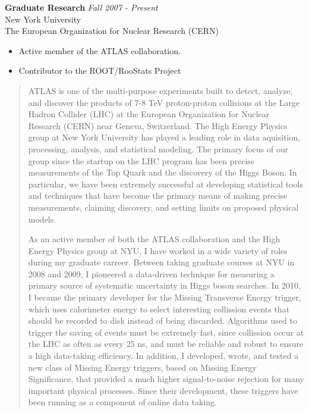 \documentclass[9pt]{article}
\newenvironment{changemargin}[2]{%
  \begin{list}{}{%
    \setlength{\topsep}{0pt}%
    \setlength{\leftmargin}{#1}%
    \setlength{\rightmargin}{#2}%
    \setlength{\listparindent}{\parindent}%
    \setlength{\itemindent}{\parindent}%
    \setlength{\parsep}{\parskip}%
  }%
  \item[]}{\end{list}
}
\newenvironment{body} {
	\vspace*{-16pt}
	\begin{changemargin}{-0.25in}{-0.5in}
  }	
	{\end{changemargin}
}
\begin{document}
\begin{body}
	\vspace{14pt}
	\textbf{Graduate Research} \hfill \emph{Fall 2007 - Present}\\
	New York University \\
        The European Organization for Nuclear Research (CERN) \\

	\vspace*{-4pt}

	\begin{itemize} \itemsep -0pt  %
		\item Active member of the ATLAS collaboration.
                \item Contributor to the ROOT/RooStats Project
	\end{itemize}

        \begin{quotation}
          \justifying

          ATLAS is one of the multi-purpose experiments built to detect, analyze, and discover the products of 7-8 TeV proton-proton collisions at the Large Hadron Collider (LHC) at the European Organization for Nuclear Research (CERN) near Geneva, Switzerland.
          The High Energy Physics group at New York University has played a leading role in data aquisition, processing, analysis, and statistical modeling.
          The primary focus of our group since the startup on the LHC program has been precise measurements of the Top Quark and the discovery of the Higgs Boson.
          In particular, we have been extremely successful at developing statistical tools and techniques that have become the primary means of making precise measurements, claiming discovery, and setting limits on proposed physical models. 

          \smallskip

          As an active member of both the ATLAS collaboration and the High Energy Physics group at NYU, I have worked in a wide variety of roles during my graduate carreer.
          Between taking graduate courses at NYU in 2008 and 2009, I pioneered a data-driven technique for measuring a primary source of systematic uncertainty in Higgs boson searches.
          In 2010, I became the primary developer for the Missing Transverse Energy trigger, which uses calorimeter energy to select interesting collission events that should be recorded to disk instead of being discarded.
          Algorithms used to trigger the saving of events must be extremely fast, since collission occur at the LHC as often as every 25 ns, and must be reliable and robust to ensure a high data-taking efficiency.
          In addition, I developed, wrote, and tested a new class of Missing Energy triggers, based on Missing Energy Significance, that provided a much higher signal-to-noise rejection for many important physical processes.
          Since their development, these triggers have been running as a component of online data taking. 


\end{quotation}
\end{body}
\end{document}
